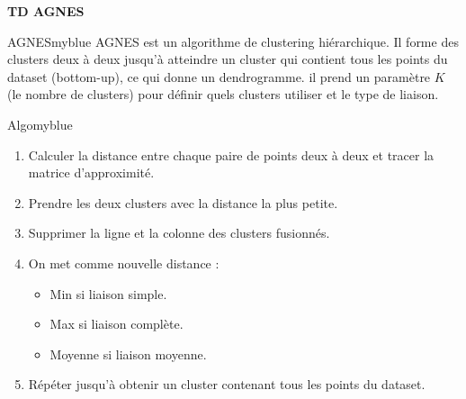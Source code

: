 \documentclass{article}
\newcommand{\tit}[1]{
\begin{center}
    \Large{\textbf{{#1}}}
\end{center}
}
\begin{document}
\tit{TD AGNES}

\vspace{0.25cm}


\begin{prettyBox}{AGNES}{myblue}
    AGNES est un algorithme de clustering hiérarchique. Il forme des clusters deux à deux jusqu'à atteindre 
    un cluster qui contient tous les points du dataset (bottom-up), ce qui donne un dendrogramme. il prend un paramètre
    $K$ (le nombre de clusters) pour définir quels clusters utiliser et le type de liaison.
\end{prettyBox}

\vspace{0.35cm}

\begin{prettyBox}{Algo}{myblue}
    \begin{enumerate}
        \setlength{\itemsep}{0pt}
        \item Calculer la distance entre chaque paire de points deux à deux et tracer la matrice d'approximité.
        \item Prendre les deux clusters avec la distance la plus petite.
        \item Supprimer la ligne et la colonne des clusters fusionnés.
        \item On met comme nouvelle distance :
            \begin{itemize}
               \setlength{\itemsep}{0pt}
                \item Min si liaison simple.
                \item Max si liaison complète.
                \item Moyenne si liaison moyenne.
            \end{itemize}
        \item Répéter jusqu'à obtenir un cluster contenant tous les points du dataset.
    \end{enumerate}
\end{prettyBox}
\end{document}
